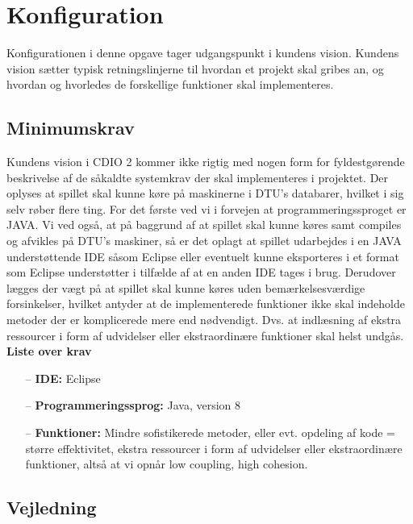 \chapter{Konfiguration}

Konfigurationen i denne opgave tager udgangspunkt i kundens vision. Kundens vision sætter typisk retningslinjerne til hvordan et projekt skal gribes an, og hvordan og hvorledes de forskellige funktioner skal implementeres.

\section{Minimumskrav}

Kundens vision i CDIO 2 kommer ikke rigtig med nogen form for fyldestgørende beskrivelse af de såkaldte systemkrav der skal implementeres i projektet. 
Der oplyses at spillet skal kunne køre på maskinerne i DTU’s databarer, hvilket i sig selv røber flere ting.
For det første ved vi i forvejen at programmeringssproget er JAVA. 
Vi ved også, at på baggrund af at spillet skal kunne køres samt compiles og afvikles på DTU's maskiner, så er det oplagt at spillet udarbejdes i en JAVA understøttende IDE såsom Eclipse eller eventuelt kunne eksporteres i et format som Eclipse understøtter i tilfælde af at en anden IDE tages i brug. 
Derudover lægges der vægt på at spillet skal kunne køres uden bemærkelsesværdige forsinkelser, hvilket antyder at de implementerede funktioner ikke skal indeholde metoder der er komplicerede mere end nødvendigt. 
Dvs. at indlæsning af ekstra ressourcer i form af udvidelser eller ekstraordinære funktioner skal helst undgås.
\\

\noindent \textbf{Liste over krav}
\begin{itemize}
    \item[--] \textbf{IDE:} Eclipse
    \item[--] \textbf{Programmeringssprog:} Java, version 8
    \item[--] \textbf{Funktioner:} Mindre sofistikerede metoder, eller evt. opdeling af kode = større effektivitet, ekstra ressourcer i form af udvidelser eller ekstraordinære funktioner, altså at vi opnår low coupling, high cohesion.
\end{itemize}

\newpage

\section{Vejledning}

